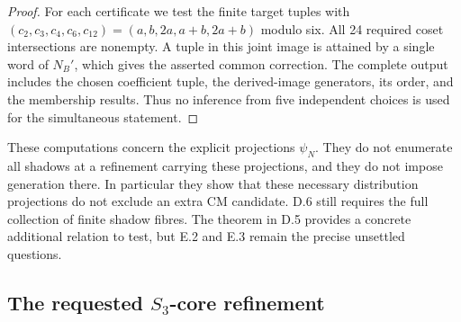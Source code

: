 \begin{proof}
For each certificate we test the finite target tuples with
$(c_2,c_3,c_4,c_6,c_{12})=(a,b,2a,a+b,2a+b)$ modulo six.
All 24 required coset intersections are nonempty. A tuple in this
joint image is attained by a single word of $N_B'$, which gives
the asserted common correction. The complete output includes the
chosen coefficient tuple, the derived-image generators, its order,
and the membership results. Thus no inference from five independent
choices is used for the simultaneous statement.
\end{proof}

These computations concern the explicit projections $\psi_N$.
They do not enumerate all shadows at a refinement carrying these
projections, and they do not impose generation there. In particular
they show that these necessary distribution projections do not
exclude an extra CM candidate. D.6 still requires the full collection
of finite shadow fibres. The theorem in D.5 provides a concrete
additional relation to test, but E.2 and E.3 remain the precise
unsettled questions.

\subsection{The requested \texorpdfstring{$S_3$}{S3}-core refinement}


